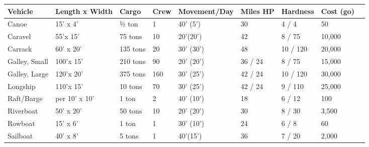 \documentclass[a4paper,twoside,openany,10pt]{book}
\begin{document}
\begin{tabular*}{1\linewidth}{@{\extracolsep{\fill}}lllllllll}
\textbf{Vehicle} & \textbf{Length x Width} & \textbf{Cargo} & \textbf{Crew} & \textbf{Movement/Day} & \textbf{Miles HP} & \textbf{Hardness} & \textbf{Cost (go)} & \\\toprule
Canoe & 15' x 4'& ½ ton & 1 & 40' (5') & 30 & 4 / 4 & 50 &\\\hline
Caravel & 55'x 15'& 75 tons & 10 & 20'(20') & 42 & 8 / 75 & 10,000& \\\hline
Carrack & 60' x 20' & 135 tons & 20 &30' (30') & 48 & 10 / 120 & 20,000 &\\\hline
Galley, Small & 100'x 15'& 210 tons & 90 & 20' (20') & 36 / 24 & 8 / 75 & 15,000 &\\\hline
Galley, Large & 120'x 20'& 375 tons & 160 & 30' (25') & 42 / 24 & 10 / 120 & 30,000 &\\\hline
Longship & 110'x 15' & 10 tons & 70 & 30' (25') & 42 / 24 & 9 / 110 & 25,000& \\\hline
Raft/Barge & per 10' x 10' & 1 ton & 2 & 40' (10') & 18 & 6 / 12 & 100 &\\\hline
Riverboat & 50' x 20' & 50 tons & 10 & 20'  (20') & 30 & 8 / 30 & 3,500 &\\\hline
Rowboat & 15' x 6' & 1 ton & 1 & 30' (10') & 24 & 6 / 8 & 60 &\\\hline
Sailboat & 40' x 8' & 5 tons & 1 & 40'(15') & 36 & 7 / 20 & 2,000 &\\\bottomrule
\end{tabular*}\vfill
\end{document}

